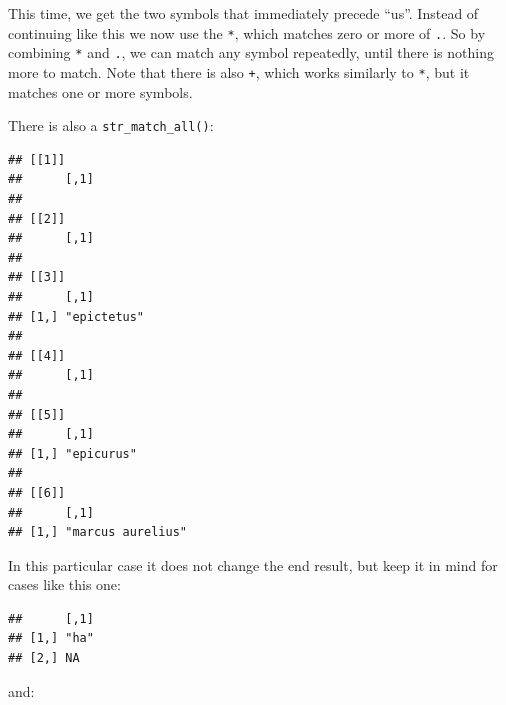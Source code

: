 \documentclass[]{gitbook}
\newenvironment{Shaded}{\begin{snugshade}}{\end{snugshade}}
\newcommand{\KeywordTok}[1]{\textcolor[rgb]{0.13,0.29,0.53}{\textbf{#1}}}
\newcommand{\NormalTok}[1]{#1}
\newcommand{\OperatorTok}[1]{\textcolor[rgb]{0.81,0.36,0.00}{\textbf{#1}}}
\newcommand{\StringTok}[1]{\textcolor[rgb]{0.31,0.60,0.02}{#1}}
\begin{document}
This time, we get the two symbols that immediately precede ``us''. Instead of continuing like this
we now use the \texttt{*}, which matches zero or more of \texttt{.}. So by combining \texttt{*} and \texttt{.}, we can match
any symbol repeatedly, until there is nothing more to match. Note that there is also \texttt{+}, which works
similarly to \texttt{*}, but it matches one or more symbols.

There is also a \texttt{str\_match\_all()}:

\begin{Shaded}
\end{Shaded}

\begin{verbatim}
## [[1]]
##      [,1]
## 
## [[2]]
##      [,1]
## 
## [[3]]
##      [,1]       
## [1,] "epictetus"
## 
## [[4]]
##      [,1]
## 
## [[5]]
##      [,1]      
## [1,] "epicurus"
## 
## [[6]]
##      [,1]             
## [1,] "marcus aurelius"
\end{verbatim}

In this particular case it does not change the end result, but keep it in mind for cases like this one:

\begin{Shaded}
\end{Shaded}

\begin{verbatim}
##      [,1]
## [1,] "ha"
## [2,] NA
\end{verbatim}

and:

\begin{Shaded}
\end{Shaded}
\end{document}
